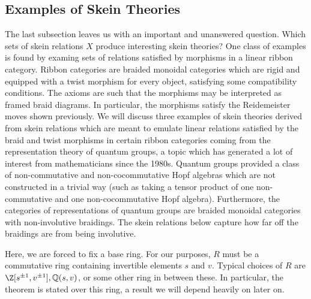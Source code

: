 
\subsection{Examples of Skein Theories}

The last subsection leaves us with an important and unanswered question. Which sets of skein relations $X$ produce interesting skein theories? One class of examples is found by examing sets of relations satisfied by morphisms in a linear ribbon category. Ribbon categories are braided monoidal categories which are rigid and equipped with a twist morphism for every object, satisfying some compatibility conditions. The axioms are such that the morphisms may be interpreted as framed braid diagrams. In particular, the morphisms satisfy the Reidemeister moves shown previously. We will discuss three examples of skein theories derived from skein relations which are meant to emulate linear relations satisfied by the braid and twist morphisms in certain ribbon categories coming from the representation theory of quantum groups, a topic which has generated a lot of interest from mathematicians since the 1980s. Quantum groups provided a class of non-commutative and non-cocommutative Hopf algebras which are not constructed in a trivial way (such as taking a tensor product of one non-commutative and one non-cocommutative Hopf algebra). Furthermore, the categories of representations of quantum groups are braided monoidal categories with non-involutive braidings. The skein relations below capture how far off the braidings are from being involutive.  

Here, we are forced to fix a base ring. For our purposes, $R$ must be a commutative ring containing invertible elements $s$ and $v$. Typical choices of $R$ are $\Z[s^{\pm 1}, v^{\pm 1}], \Q(s, v)$, or some other ring in between these.  In particular, the theorem  is stated over this ring, a result we will depend heavily on later on. \\


